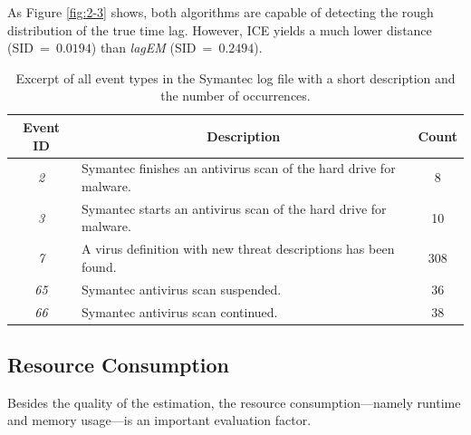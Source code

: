 \documentclass[conference]{IEEEtran}
\theoremstyle{examplestyle}
\begin{document}
As Figure \ref{fig:2-3} shows, both algorithms are capable of detecting the rough distribution of the true time lag. However, \ac{ICE} yields a much lower distance (\ac{SID}~=~$0.0194$) than \textit{lagEM} (\ac{SID}~=~$0.2494$).


\begin{table}[!tb]
	\caption{Excerpt of all event types in the Symantec log file with a short description and the number of occurrences.}
	\label{tbl:symantecEvents}

	\centering
	\begin{tabular}{c p{} c}
		\textbf{Event ID} & \multicolumn{1}{c}{\textbf{Description}} & \textbf{Count} \\
		\hline
		\textit{2}	& Symantec finishes an antivirus scan of the hard drive for malware. & 8 \\
		\textit{3}	& Symantec starts an antivirus scan of the hard drive for malware. & 10 \\
		\textit{7}	& A virus definition with new threat descriptions has been found. & 308 \\
		\textit{65}	& Symantec antivirus scan suspended. & 36 \\
		\textit{66}	& Symantec antivirus scan continued. & 38 \\
	\end{tabular}

\end{table}


\subsection{Resource Consumption}
Besides the quality of the estimation, the resource consumption---namely runtime and memory usage---is an important evaluation factor. 
\end{document}

